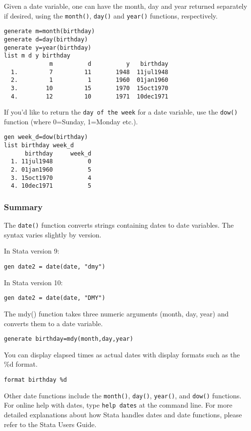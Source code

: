 Given a date variable, one can have the month, day and year returned separately if desired, using the \lstinline{month()}, \lstinline{day()} and \lstinline{year()} functions, respectively.

\begin{lstlisting}
generate m=month(birthday)
generate d=day(birthday)
generate y=year(birthday)
list m d y birthday
             m          d          y   birthday
  1.         7         11       1948  11jul1948
  2.         1          1       1960  01jan1960
  3.        10         15       1970  15oct1970
  4.        12         10       1971  10dec1971
\end{lstlisting}

If you'd like to return the \lstinline{day of the week} for a date variable, use the \lstinline{dow()} function (where 0=Sunday, 1=Monday etc.).

\begin{lstlisting}
gen week_d=dow(birthday)
list birthday week_d
      birthday     week_d
  1. 11jul1948          0
  2. 01jan1960          5
  3. 15oct1970          4
  4. 10dec1971          5
\end{lstlisting}

\subsubsection{Summary}

The \lstinline{date()} function converts strings containing dates to date variables. The syntax varies slightly by version.
\begin{compactitem}
\item In Stata version 9:
\begin{lstlisting}
gen date2 = date(date, "dmy")
\end{lstlisting}
\item In Stata version 10:
\begin{lstlisting}
gen date2 = date(date, "DMY")
\end{lstlisting}
\item The mdy() function takes three numeric arguments (month, day, year) and converts them to a date variable.
\begin{lstlisting}
generate birthday=mdy(month,day,year)
\end{lstlisting}
\item You can display elapsed times as actual dates with display formats such as the \%d format.
\begin{lstlisting}
format birthday %d
\end{lstlisting}
\end{compactitem}

Other date functions include the \lstinline{month()}, \lstinline{day()}, \lstinline{year()}, and \lstinline{dow()} functions. For online help with dates, type \lstinline{help dates} at the command line. For more detailed explanations about how Stata handles dates and date functions, please refer to the Stata Users Guide.
